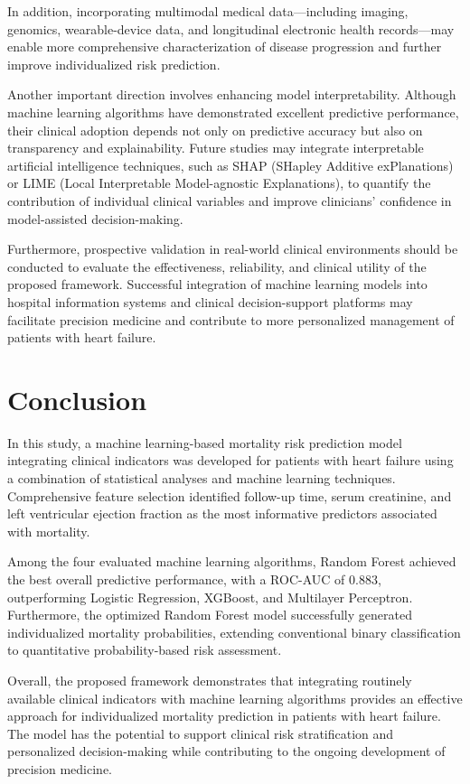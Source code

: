 \documentclass[12pt]{article}
\begin{document}
In addition, incorporating multimodal medical data—including imaging, genomics, wearable-device data, and longitudinal electronic health records—may enable more comprehensive characterization of disease progression and further improve individualized risk prediction.

Another important direction involves enhancing model interpretability. Although machine learning algorithms have demonstrated excellent predictive performance, their clinical adoption depends not only on predictive accuracy but also on transparency and explainability. Future studies may integrate interpretable artificial intelligence techniques, such as SHAP (SHapley Additive exPlanations) or LIME (Local Interpretable Model-agnostic Explanations), to quantify the contribution of individual clinical variables and improve clinicians' confidence in model-assisted decision-making.

Furthermore, prospective validation in real-world clinical environments should be conducted to evaluate the effectiveness, reliability, and clinical utility of the proposed framework. Successful integration of machine learning models into hospital information systems and clinical decision-support platforms may facilitate precision medicine and contribute to more personalized management of patients with heart failure. 

 

\section{Conclusion}
In this study, a machine learning-based mortality risk prediction model integrating clinical indicators was developed for patients with heart failure using a combination of statistical analyses and machine learning techniques. Comprehensive feature selection identified follow-up time, serum creatinine, and left ventricular ejection fraction as the most informative predictors associated with mortality.

Among the four evaluated machine learning algorithms, Random Forest achieved the best overall predictive performance, with a ROC-AUC of 0.883, outperforming Logistic Regression, XGBoost, and Multilayer Perceptron. Furthermore, the optimized Random Forest model successfully generated individualized mortality probabilities, extending conventional binary classification to quantitative probability-based risk assessment.

Overall, the proposed framework demonstrates that integrating routinely available clinical indicators with machine learning algorithms provides an effective approach for individualized mortality prediction in patients with heart failure. The model has the potential to support clinical risk stratification and personalized decision-making while contributing to the ongoing development of precision medicine.
\end{document}
